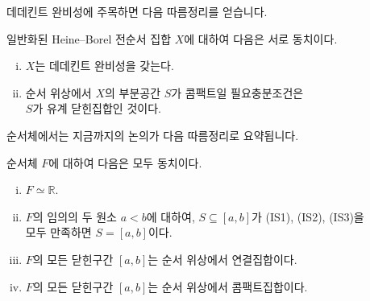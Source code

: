 \documentclass[serif]{beamer}
\begin{document}
\begin{frame}{}
    데데킨트 완비성에 주목하면 다음 따름정리를 얻습니다.
    \begin{cor*}{일반화된 Heine--Borel}
        전순서 집합 $X$에 대하여 다음은 서로 동치이다.
        \begin{enumerate}[(i)]
            \item $X$는 데데킨트 완비성을 갖는다.
            \item 순서 위상에서 $X$의 부분공간 $S$가 콤팩트일 필요충분조건은 \\ $S$가 유계 닫힌집합인 것이다.
        \end{enumerate}
    \end{cor*}
    순서체에서는 지금까지의 논의가 다음 따름정리로 요약됩니다.
    \begin{cor*}{}
        순서체 $F$에 대하여 다음은 모두 동치이다.
        \begin{enumerate}[(i)]
            \item $F\simeq\mathbb R$.
            \item $F$의 임의의 두 원소 $a<b$에 대하여, $S\subseteq[a,b]$가 (IS1), (IS2), (IS3)을 \\ 모두 만족하면 $S=[a,b]$이다.
            \item $F$의 모든 닫힌구간 $[a,b]$는 순서 위상에서 연결집합이다.
            \item $F$의 모든 닫힌구간 $[a,b]$는 순서 위상에서 콤팩트집합이다.
        \end{enumerate}
    \end{cor*}
\end{frame}
\end{document}
